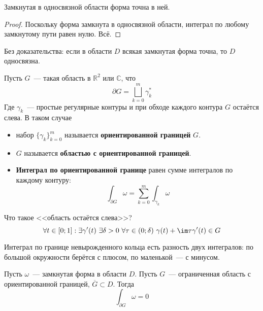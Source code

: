 \documentclass{article}
\begin{document}
    \begin{theorem}
        Замкнутая в односвязной области форма точна в ней.
    \end{theorem}
    \begin{proof}
        Поскольку форма замкнута в односвязной области, интеграл по любому замкнутому пути равен нулю. Всё.
    \end{proof}
    \begin{claim}
        Без доказательства: если в области $D$ всякая замкнутая форма точна, то $D$ односвязна.
    \end{claim}
    \begin{definition}
        Пусть $G$~--- такая область в $\mathbb R^2$ или $\mathbb C$, что
        $$\partial G=\bigsqcup\limits_{k=0}^m\gamma_k^*$$
        Где $\gamma_k$~--- простые регулярные контуры и при обходе каждого контура $G$ остаётся слева. В таком случае
        \begin{itemize}
            \item набор $\{\gamma_k\}_{k=0}^m$ называется \textbf{ориентированной границей} $G$.
            \item $G$ называется \textbf{областью с ориентированной границей}.
            \item \textbf{Интеграл по ориентированной границе} равен сумме интегралов по каждому контуру:
            $$
            \int_{\partial G}\omega=\sum\limits_{k=0}^m\int_{\gamma_k}\omega
            $$
        \end{itemize}
    \end{definition}
    \begin{remark}
        Что такое <<область остаётся слева>>?
        $$
        \forall t\in[0;1]:\exists\gamma'(t)~\exists\delta>0~\forall\tau\in(0;\delta)~\gamma(t)+\im\tau\gamma'(t)\in G
        $$
    \end{remark}
    \begin{example}
        Интеграл по границе невырожденного кольца есть разность двух интегралов: по большой окружности берётся с плюсом, по маленькой~--- с минусом.
    \end{example}
    \begin{theorem}
        \label{Интеграл по ориентированной границе}
        Пусть $\omega$~--- замкнутая форма в области $D$. Пусть $G$~---  ограниченная область с ориентированной границей, $\overline G\subset D$. Тогда
        $$
        \int_{\partial G}\omega=0
        $$
    \end{theorem}
\end{document}
